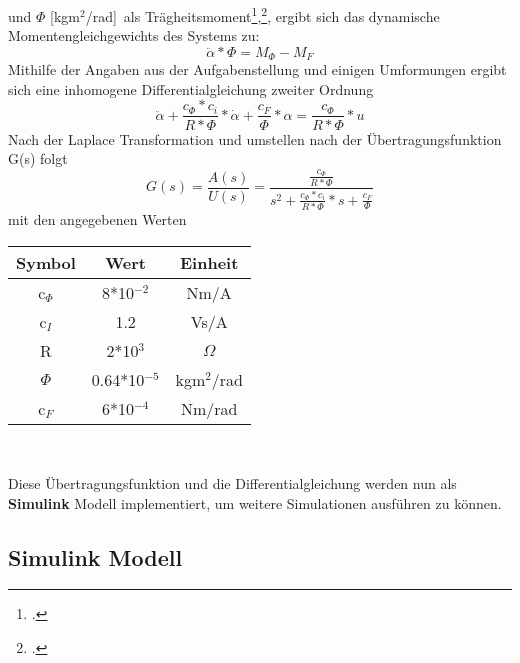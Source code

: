 \documentclass[12pt,a4paper]{scrartcl}	%
\begin{document}
und \textbf{$\Phi$} [kgm$^{2}$/rad]~als Trägheitsmoment\footcite[vgl.][76 \psq]{elek},\footcite[vgl.][S. 264 ]{lehr}, ergibt sich das dynamische Momentengleichgewichts des Systems zu:
\[  \ddot{\alpha}*\Phi = M_{\Phi} - M_{F} \]
Mithilfe der Angaben aus der Aufgabenstellung und einigen Umformungen ergibt sich eine inhomogene Differentialgleichung zweiter Ordnung
\begin{equation}
 \ddot{\alpha}+\frac{c_{\Phi}*c_{i}}{R*\Phi}*\dot{\alpha}+\frac{c_{F}}{\Phi}*\alpha = \frac{c_{\Phi}}{R*\Phi}*u  
\end{equation}
Nach der Laplace Transformation und umstellen nach der Übertragungsfunktion G(s) folgt
\begin{equation}\label{laplace}
 G(s) = \frac{A(s)}{U(s)}= \frac{\frac{c_{\Phi}}{R*\Phi}}{s^{2}+\frac{c_{\Phi}*c_{i}}{R*\Phi}*s+\frac{c_{F}}{\Phi}} 
 \end{equation}
mit den angegebenen Werten\\
\begin{center}
 \begin{tabular}{|c|c|c|}
 	
 	\hline 
 Symbol	& Wert &  Einheit\\ 
 	\hline 
 	\hline
 c$_{\Phi}$	& 8*10$^{-2}$ & Nm/A \\ 
 	\hline 
 c$_{I}$	& 1.2 & Vs/A  \\ 
 	\hline 
 R	&2*10$^{3}$  & $\Omega$ \\ 
 	\hline 
 $\Phi$	& 0.64*10$^{-5}$ & kgm$^{2}$/rad  \\ 
 	\hline 
 c$_{F}$	& 6*10$^{-4}$  & Nm/rad \\ 
 	\hline 
 \end{tabular}\\
\end{center}
Diese Übertragungsfunktion und die Differentialgleichung werden nun als \textbf{Simulink} Modell implementiert, um weitere Simulationen ausführen zu können.


\subsection{Simulink Modell}	
\end{document}
